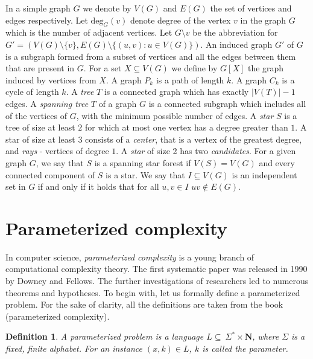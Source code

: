 \documentclass[en]{pracamgr}
\newtheorem{definition}{Definition}
\newcommand{\ssf}{spanning star forest}
\newcommand{\degree}[2]{\textrm{deg}_{#1}(#2)}
\begin{document}
In a simple graph $G$ we denote by $V(G)$ and $E(G)$ the set of vertices and edges respectively. 
Let $\degree{G}{v}$ denote degree of the vertex $v$ in the graph $G$ which is the number of adjacent vertices. 
Let $G \setminus v$ be the abbreviation for $G'=(V(G) \setminus \{v\}, E(G) \setminus \{(u,v): u \in V(G)\})$. 
An induced graph $G'$ of $G$ is a subgraph formed from a subset of vertices and all the edges between them that are present in $G$. For a set $X \subseteq V(G)$ we define by $G[X]$ the graph induced by vertices from $X$. 
A graph $P_k$ is a path of length $k$. A graph $C_k$ is a cycle of length $k$. 
A \emph{tree} $T$ is a connected graph which has exactly $|V(T)|-1$ edges. 
A \emph{spanning tree} $T$ of a graph $G$ is a connected subgraph which includes all of the vertices of $G$, with the minimum possible number of edges.
A \emph{star} $S$ is a tree of size at least $2$ for which at most one vertex has a degree greater than $1$. 
A star of size at least $3$ consists of a \emph{center}, that is a vertex of the greatest degree, and \emph{rays} - vertices of degree $1$. 
A \emph{star} of size 2 has two \emph{candidates}.
For a given graph $G$, we say that $S$ is a \ssf{} if $V(S)=V(G)$ and every connected component of $S$ is a star.
We say that $I \subseteq V(G)$ is an independent set in $G$ if and only if it holds that for all $u,v \in I$ $uv \notin E(G)$.

\section{Parameterized complexity}

In computer science, \emph{parameterized complexity} is a young branch of computational complexity theory. The first systematic paper was released in 1990 by Downey and Fellows. The further investigations of researchers led to numerous theorems and hypotheses. To begin with, let us formally define a parameterized problem. For the sake of clarity, all the definitions are taken from the book (parameterized complexity).


\begin{definition}\label{Parameterized problem}
	A {\textup{parameterized problem}} is a language $L \subseteq \ \Sigma^* \times \mathbf{N}$, where $\Sigma$ is a fixed, finite alphabet. For an instance $(x,k) \in L$, $k$ is called the \textup{parameter}.
\end{definition}
\end{document}
